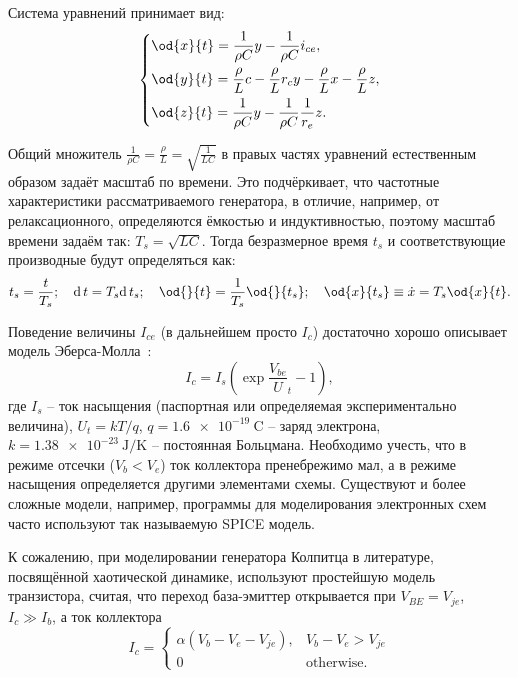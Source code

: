 Система уравнений принимает вид:
%
\begin{equation}
\label{atu:eq:colp_phys2}
\begin{dcases}
  \od{x}{t}  = \dfrac{1}{\rho C}  y - \dfrac{1}{\rho C} i_{ce} , \\
  \od{y}{t}  = \dfrac{\rho}{L} c    - \dfrac{\rho}{L} r_c y - \dfrac{\rho}{L} x- \dfrac{\rho}{L} z, \\
  \od{z}{t}  = \dfrac{1}{\rho C}  y - \dfrac{1}{\rho C} \dfrac{1}{r_e} z.
\end{dcases}
\end{equation}

Общий множитель $ \frac{1}{\rho C} = \frac{\rho}{L} = \sqrt{\frac{1}{LC}} $ в правых частях уравнений
естественным образом задаёт масштаб по времени.
Это подчёркивает, что частотные характеристики рассматриваемого генератора,
в отличие, например, от релаксационного,
определяются ёмкостью и индуктивностью,
поэтому масштаб времени задаём так:
$ T_s = \sqrt{L C} $.
Тогда безразмерное время $t_s$
и соответствующие производные
будут определяться как:
%
\[
  t_s = \frac{t}{T_s}; \quad
  \mathrm{d}\, t = T_s \mathrm{d}\, t_s; \quad
  \od{}{t}  = \frac{1}{T_s} \od{}{t_s}; \quad
  \od{x}{t_s} \equiv \dot{x} = T_s \od{x}{t} .
\]

Поведение величины $I_{ce}$ (в дальнейшем просто $I_c$) достаточно хорошо описывает модель
Эберса-Молла~\cite{horowitz}:
%
\begin{equation}
  I_c = I_s \left( \exp\frac{V_{be}}U_t{} - 1 \right),
  \label{atu:eq:ebers-moll}
\end{equation}
%
где
$I_s$ -- ток насыщения (паспортная или определяемая экспериментально величина),
$U_t=kT/q$,
$q = \SI{1.6e-19}{\coulomb}$ -- заряд электрона,
$k = \SI{1.38e-23}{\joule/\kelvin}$ -- постоянная Больцмана.
Необходимо учесть, что в режиме отсечки ($V_b < V_e$) ток коллектора пренебрежимо мал,
а в режиме насыщения определяется другими элементами схемы.
Существуют и более сложные модели, например,
программы для моделирования электронных схем часто используют так называемую SPICE модель.

К сожалению, при моделировании генератора Колпитца в литературе,
посвящённой хаотической динамике, используют
простейшую модель транзистора, считая, что переход
база-эмиттер открывается при $V_{BE} = V_{je}$, $ I_c \gg I_b$,
а ток коллектора
%
\begin{equation}
I_c =
  \begin{cases}
    \alpha ( V_b - V_e - V_{je} ), & V_b - V_e > V_{je} \\
    0                              & \text{otherwise}.
  \end{cases}
  \label{atu:eq:bjt_libear_model}
\end{equation}


